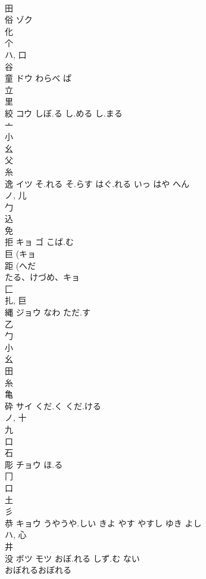\documentclass[8pt]{extreport}
\begin{document}
\begin{CJK}{UTF8}{min}
\\	田 
\\	俗	ゾク		
\\	化 
\\	个 
\\	ハ, 口 
\\	谷 
\\	童	ドウ	わらべ ぱ	
\\	立 
\\	里 
\\	絞	コウ	しぼ.る し.める し.まる	
\\	亠 
\\	小 
\\	幺 
\\	父 
\\	糸 
\\	逸	イツ	そ.れる そ.らす はぐ.れる いっ はや へん	
\\	ノ, 儿 
\\	勹 
\\	込 
\\	免 
\\	拒	キョ ゴ	こば.む	
\\	巨 (キョ 
\\	距 (へだ
\\	たる、けづめ、キョ 
\\	匚 
\\	扎, 巨 
\\	縄	ジョウ	なわ ただ.す	
\\	乙 
\\	勹 
\\	小 
\\	幺 
\\	田 
\\	糸 
\\	亀 
\\	砕	サイ	くだ.く くだ.ける	
\\	ノ, 十 
\\	九 
\\	口 
\\	石 
\\	彫	チョウ	ほ.る	
\\	冂 
\\	口 
\\	土 
\\	彡 
\\	恭	キョウ	うやうや.しい きよ やす やすし ゆき よし	
\\	ハ, 心 
\\	井 
\\	没	ボツ モツ	おぼ.れる しず.む ない	
\\	おぼれるおぼれる

\end{CJK}
\end{document}

